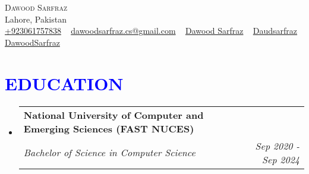 \documentclass[letterpaper,11pt]{article}
\makeatletter
\newcommand{\resumeSubheading}[4]{
	\vspace{-2pt}\item
	\begin{tabular*}{1.0\textwidth}[t]{l@{\extracolsep{\fill}}r}
		\textbf{\large#1} & \textbf{\small #2} \\
		\textit{\large#3} & \textit{\small #4} \\
		
	\end{tabular*}\vspace{-7pt}
}
\newcommand{\resumeSubHeadingListStart}{\begin{itemize}[leftmargin=0.0in, label={}]}
\newcommand{\resumeSubHeadingListEnd}{\end{itemize}}
\makeatother
\begin{document}
	
	
	
	\begin{center}
		{\Huge \scshape Dawood Sarfraz} \\ \vspace{1pt}
		Lahore, Pakistan \\ \vspace{1pt}
		\small 
		\href{tel:+9203061757838}{\raisebox{-0.1\height}{\faPhone} {+923061757838}} ~ 
		\href{mailto:yourname@gmail.com}{\raisebox{-0.2\height}{\faEnvelope} {dawoodsarfraz.cs@gmail.com}} ~ 
		\href{https://linkedin.com/in/dawood-sarfraz-0466541b6}{\raisebox{-0.2\height}{\faLinkedin} {Dawood Sarfraz}} ~
		\href{https://github.com/Daudsarfraz}{\raisebox{-0.2\height}{\faGithub} 
		{Daudsarfraz}} ~
		\href{https://daudsarfraz.github.io/DawoodSarfraz/}{\raisebox{-0.2\height}{\faGlobe} {DawoodSarfraz}}
		\vspace{-5pt}
	\end{center}
	
	
	\section{\textcolor{blue}{EDUCATION}}
	\resumeSubHeadingListStart
	\resumeSubheading
	{National University of Computer and Emerging Sciences (FAST NUCES)}{}
	{Bachelor of Science in Computer Science }{Sep 2020 - Sep 2024}
	\resumeSubHeadingListEnd
	\vspace{-10pt}
	
	
\end{document}

